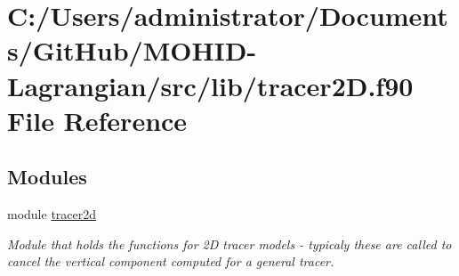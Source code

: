 \hypertarget{tracer2_d_8f90}{}\section{C\+:/\+Users/administrator/\+Documents/\+Git\+Hub/\+M\+O\+H\+I\+D-\/\+Lagrangian/src/lib/tracer2D.f90 File Reference}
\label{tracer2_d_8f90}
\subsection*{Modules}
\begin{DoxyCompactItemize}
\item 
module \mbox{\hyperlink{namespacetracer2d}{tracer2d}}
\begin{DoxyCompactList}\small\item\em Module that holds the functions for 2D tracer models -\/ typicaly these are called to cancel the vertical component computed for a general tracer. \end{DoxyCompactList}\end{DoxyCompactItemize}
